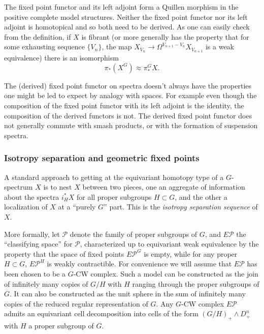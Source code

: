 \documentclass{amsart}
\theoremstyle{definition}
\theoremstyle{remark}
\newcommand{\pfamily}{\mathcal P}
\begin{document}
The fixed point functor and its left adjoint form a Quillen morphism
in the positive complete model structures.  Neither the fixed point
functor nor its left adjoint is homotopical and so both need to be
derived.  As one can easily check from the definition, if $X$ is
fibrant (or more generally has the property that for some exhausting
sequence $\{V_{n} \}$, the map $X_{V_{n}}\to
\Omega^{V_{n+1}-V_{n}}X_{V_{n+1}}$ is a weak equivalence) there is an
isomorphism
\[
\pi_{\ast}(X^{G}) \approx \pi^{G}_{\ast}X.
\]

The (derived) fixed point functor on spectra doesn't always have the
properties one might be led to expect by analogy with spaces.  For
example even though the composition of the fixed point functor with
its left adjoint is the identity, the composition of the derived
functors is not.  The derived fixed point functor does not generally
commute with smash products, or with the formation of suspension
spectra.

\subsubsection{Isotropy separation and geometric fixed points}
\label{sec:isotropy-separation}

A standard approach to getting at the equivariant homotopy type of a
$G$-spectrum $X$ is to nest $X$ between two pieces, one an aggregate
of information about the spectra $i_{H}^{\ast}X$ for all proper
subgroups $H\subset G$, and the other a localization of $X$ at a
``purely $G$'' part.  This is the {\em isotropy separation sequence}
of $X$.

More formally, let $\pfamily$ denote the family of proper subgroups of
$G$, and $E\pfamily$ the ``classifying space'' for $\pfamily$,
characterized up to equivariant weak equivalence by the property that
the space of fixed points $E\pfamily^{G}$ is empty, while for any
proper $H\subset G$, $E\pfamily^{H}$ is weakly contractible.  For
convenience we will assume that $E\pfamily$ has been chosen to be a
$G$-CW complex.  Such a model can be constructed as the join of
infinitely many copies of $G/H$ with $H$ ranging through the proper
subgroups of $G$.  It can also be constructed as the unit sphere in
the sum of infinitely many copies of the reduced regular
representation of $G$.  Any $G$-CW complex $E\pfamily$ admits an
equivariant cell decomposition into cells of the form $(G/H)_{+}\wedge
D^{n}_{+}$ with $H$ a proper subgroup of $G$.
\end{document}
